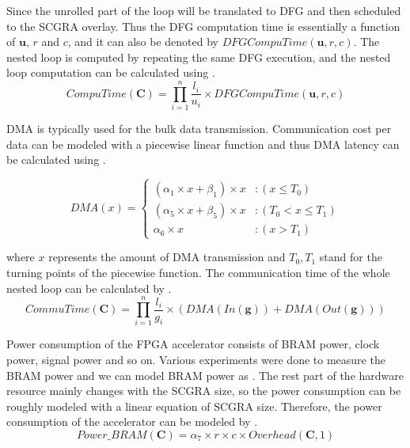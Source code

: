 Since the unrolled part of the loop will be translated to 
DFG and then scheduled to the SCGRA overlay. Thus the DFG computation time 
is essentially a function of $\mathbf{u}$, $r$ and $c$, and it can also be 
denoted by $DFGCompuTime(\mathbf{u},r,c)$.
The nested loop is computed by repeating the same DFG execution, and the 
nested loop computation can be calculated using .
\begin{equation} \label{eq:loopexetime}
    CompuTime(\bm{C})=\displaystyle \prod_{i=1}^{n} \frac{l_i}{u_i} \times DFGCompuTime(\mathbf{u},r,c)
\end{equation}

DMA is typically used for the bulk data transmission. Communication cost per 
data can be modeled with a piecewise linear function and thus DMA latency can be 
calculated using .

\begin{equation} \label{eq:DMA}
    DMA(x)=%
    \begin{cases}
        (\alpha_1\times x + \beta_1) \times x &: (x \leq T_0) \\
        (\alpha_5\times x + \beta_5) \times x &: (T_0 < x \leq T_1) \\
        \alpha_6\times x &: (x > T_1)
    \end{cases}
\end{equation}

where $x$ represents the amount of DMA transmission and $T_0, T_1$ stand for 
the turning points of the piecewise function. The communication time of the 
whole nested loop can be calculated by .
\begin{equation} \label{eq:commu}
    CommuTime(\bm{C})=\displaystyle \prod_{i=1}^{n} \frac{l_i}{g_i} \times 
    (DMA(In(\mathbf{g}))+DMA(Out(\mathbf{g})))
\end{equation}

Power consumption of the FPGA accelerator consists of 
BRAM power, clock power, signal power and so on. 
Various experiments were done to measure the BRAM power and 
we can model BRAM power as . 
The rest part of the hardware resource mainly changes with the SCGRA size, 
so the power consumption can be roughly modeled with a linear 
equation of SCGRA size. Therefore, the power consumption 
of the accelerator can be modeled by .
\begin{equation} \label{eq:brampower}
    Power\_BRAM(\bm{C})=\alpha_7 \times r \times c \times Overhead(\bm{C}, 1)
\end{equation}

